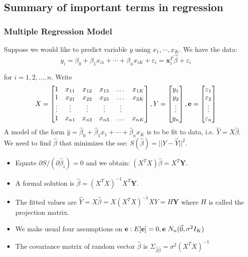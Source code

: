 \documentclass[12pt]{article}
\begin{document}
\subsection{Summary of important terms in regression}
\subsubsection{Multiple Regression Model}
Suppose we would like to predict variable $y$ using $x_1, \cdots, x_K$. We have the data:
$$y_i=\beta_0+\beta_1 x_{i1}+\cdots +\beta_n x_{iK}+\varepsilon_i={\textbf{x}_i^T\vec \beta}+\varepsilon_i$$

for $i=1, 2, ..., n$. 
Write 
$$X=\begin{bmatrix}
    1   & x_{11}       & x_{12} & x_{13} & \dots & x_{1K} \\
    1   & x_{21}       & x_{22} & x_{23} & \dots & x_{2K} \\
    \vdots   & \vdots & \vdots &\vdots &\vdots \\
    1 & x_{n1}       & x_{n2} & x_{n3} & \dots & x_{nK}
\end{bmatrix}, Y=\begin{bmatrix}
y_1\\
y_2\\
\vdots\\
y_n
\end{bmatrix}, \textrm{\textbf{e}}=\begin{bmatrix}
\varepsilon_1\\
\varepsilon_2\\
\vdots\\
\varepsilon_n
\end{bmatrix}$$
A model of the form
$\hat y=\hat \beta_0+\hat \beta_1 x_1+\cdots +\hat \beta_n x_K$
is to be fit to data, i.e. $\hat Y=X\hat \beta$. We need to find $\hat \beta $ that minimizes the \acrfull{sse}: $S(\hat \beta)=||Y-\hat Y||^2$.
\begin{itemize}
    \item Equate $\partial S/(\partial \hat \beta_i )=0$ and we obtain: $(X^T X) \hat \beta=X^T \textbf{Y}$.
    \item A formal solution is $\hat \beta=(X^T X)^{-1} X^T \textbf{Y}$. 
    \item The fitted values are $\hat Y=X\hat \beta=X(X^T X)^{-1}XY=H\textbf{Y}$ where $H$ is called the projection matrix.
    
    \item We make usual four assumptions on $\textrm{\textbf{e}}: E[\textbf{\textrm{e}}]=0, \textbf{\textrm{e}}~N_n(\vec 0, \sigma^2 I_K)$
    \item The covariance matrix of random vector $\hat \beta$ is $\Sigma_{\hat \beta \hat \beta}=\sigma^2 (X^T X)^{-1}$
\end{itemize}
\end{document}
